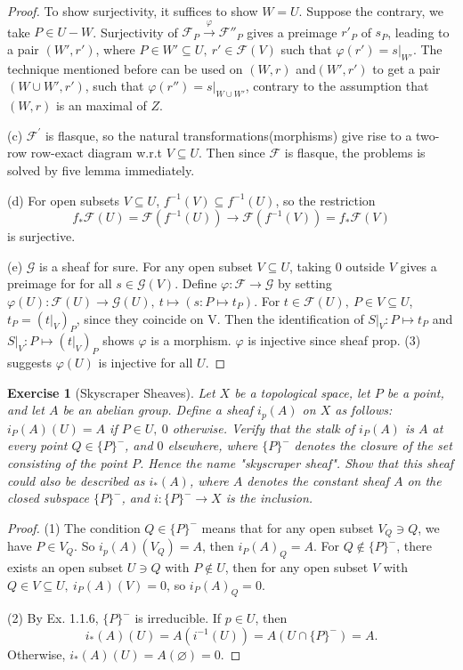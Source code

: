 \documentclass[12pt]{amsart}
\newtheorem{exe}{Exercise}[subsection]
\begin{document}
\begin{proof}
	To show surjectivity, it suffices to show $W=U$. Suppose the contrary, we take $P\in U-W$. Surjectivity of $\mathscr{F}_P\xrightarrow{\varphi} \mathscr{F}''_P$ gives a preimage $r'_P$ of $s_P$, leading to a pair $(W',r')$, where $P\in W'\subseteq U,\ r'\in \mathscr{F}(V)$ such that $\varphi(r')=s|_{W'}$. The technique mentioned before can be used on $(W,r)$ and$(W',r')$ to get a pair $(W\cup W',r')$, such that $\varphi(r'')=s|_{W\cup W'}$, contrary to the assumption that $(W,r)$ is an maximal of $Z$.
	
	(c) $\mathscr{F}^{'}$ is flasque, so the natural transformations(morphisms) give rise to a two-row row-exact diagram w.r.t $V\subseteq U$. Then since $\mathscr{F}$ is flasque, the problems is solved by five lemma immediately.
	
	(d) For open subsets $V\subseteq U$, $f^{-1}(V)\subseteq f^{-1}(U)$, so the restriction $$f_{*}\mathscr{F}(U)=\mathscr{F}(f^{-1}(U))\rightarrow \mathscr{F}(f^{-1}(V))=f_*\mathscr{F}(V)$$ is surjective.
	
	(e) $\mathscr{G}$ is a sheaf for sure. For any open subset $V\subseteq U$, taking $0$ outside $V$ gives a preimage for for all $s \in \mathscr{G}(V)$. Define $\varphi: \mathscr{F}\rightarrow \mathscr{G}$ by setting $\varphi(U): \mathscr{F}(U)\rightarrow \mathscr{G}(U),\ t\mapsto (s: P \mapsto t_P)$. For $t\in \mathscr{F}(U),\ P\in V\subseteq U$, $t_P=(t|_V)_P$, since they coincide on V. Then the identification of $S|_V: P\mapsto t_P$ and $S|_V: P\mapsto (t|_V)_P$ shows $\varphi$ is a morphism. $\varphi$ is injective since sheaf prop. (3) suggests $\varphi(U)$ is injective for all $U$.
\end{proof}

\begin{exe}[Skyscraper Sheaves]
	\label{2.1.17}
	Let $X$ be a topological space, let $P$ be a point, and let $A$ be an abelian group. Define a sheaf $i_p(A)$ on $X$ as follows: $i_P(A)(U)=A$ if $P\in U,\ 0$ otherwise. Verify that the stalk of $i_P(A)$ is $A$ at every point $Q\in \{P\}^-$, and $0$ elsewhere, where $\{P\}^-$ denotes the closure of the set consisting of the point $P$. Hence the name "skyscraper sheaf". Show that this sheaf could also be described as $i_*(A)$, where $A$ denotes the constant sheaf $A$ on the closed subspace $\{P\}^-$, and $i:\{P\}^-\rightarrow X$ is the inclusion.
	
\end{exe}

\begin{proof}
	(1) The condition $Q\in \{P\}^-$ means that for any open subset $V_Q\ni Q$, we have $P\in V_Q$. So $i_p(A)(V_Q)=A$, then $i_P(A)_Q=A$. For $Q\notin \{P\}^-$, there exists an open subset $U\ni Q$ with $P\notin U$, then for any open subset $V$ with $Q\in V\subseteq U,\ i_P(A)(V)=0$, so $i_P(A)_Q=0$.
	
	
	(2) By Ex. 1.1.6, $\{P\}^-$ is irreducible. If $p\in U$, then $$i_*(A)(U)=A(i^{-1}(U))=A(U\cap \{P\}^-)=A.$$ Otherwise, $i_*(A)(U)=A(\varnothing)=0$.
\end{proof}
\end{document}
